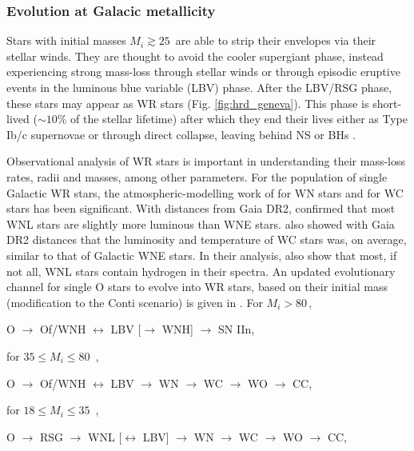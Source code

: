 \subsubsection{Evolution at Galacic metallicity} \label{sect:evo_galactic}

Stars with initial masses $M_i \gtrsim 25\,$\Msun{} are able to strip their envelopes via their stellar winds. They are thought to avoid the cooler supergiant phase, instead experiencing strong mass-loss through stellar winds or through episodic eruptive events in the luminous blue variable (LBV) phase. After the LBV/RSG phase, these stars may appear as WR stars (Fig. \ref{fig:hrd_geneva}). This phase is short-lived (${\sim}10$\% of the stellar lifetime) after which they end their lives either as Type Ib/c supernovae or through direct collapse, leaving behind NS or BHs \citep{heger_how_2003}.   

Observational analysis of WR stars is important in understanding their mass-loss rates, radii and masses, among other parameters. For the population of single Galactic WR stars, the atmospheric-modelling work of \citet{hamann_galactic_2019} for WN stars and \citet{sander_galactic_2019} for WC stars has been significant. With distances from Gaia DR2, \citet{hamann_galactic_2019} confirmed that most WNL stars are slightly more luminous than WNE stars. \citet{sander_galactic_2019} also showed with Gaia DR2 distances that the luminosity and temperature of WC stars was, on average, similar to that of Galactic WNE stars. In their analysis, \citet{hamann_galactic_2019} also show that most, if not all, WNL stars contain hydrogen in their spectra. An updated evolutionary channel for single O stars to evolve into WR stars, based on their initial mass (modification to the Conti scenario) is given in \citet{sander_galactic_2019}. For $M_i > 80\,$\Msun{},

\centerline{O $\longrightarrow$ Of/WNH $\longleftrightarrow$ LBV  [$\longrightarrow$ WNH] $\longrightarrow$ SN IIn,}

for $35 \le M_i \le 80\,$ \Msun{}, 

\centerline{O $\longrightarrow$ Of/WNH $\longleftrightarrow$ LBV  $\longrightarrow$ WN $\longrightarrow$ WC $\longrightarrow$ WO $\longrightarrow$ CC,}

for $18 \le M_i \le 35\,$ \Msun{},

\centerline{O $\longrightarrow$ RSG $\longrightarrow$ WNL [$\longleftrightarrow$ LBV] $\longrightarrow$ WN $\longrightarrow$ WC $\longrightarrow$ WO $\longrightarrow$ CC,}

